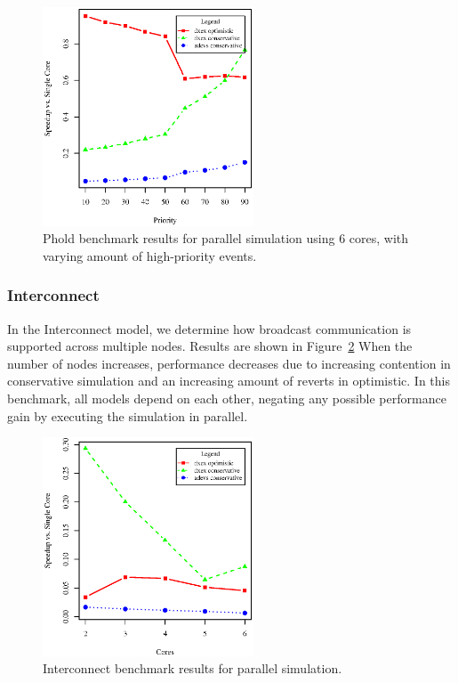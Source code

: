 \begin{figure}
    \includegraphics[width=\columnwidth,height=6.5cm]{fig/phold_priority.eps}
    \caption{Phold benchmark results for parallel simulation using 6 cores, with varying amount of high-priority events.}
    \label{fig:phold_priority}
\end{figure}

\subsubsection{Interconnect}
In the Interconnect model, we determine how broadcast communication is supported across multiple nodes.
Results are shown in Figure~\ref{fig:interconnect_benchmark_parallel}
When the number of nodes increases, performance decreases due to increasing contention in conservative simulation and an increasing amount of reverts in optimistic. In this benchmark, all models depend on each other, negating any possible performance gain by executing the simulation in parallel.

\begin{figure}
    \includegraphics[width=\columnwidth,height=6.5cm]{fig/interconnect_parallel.eps}
    \caption{Interconnect benchmark results for parallel simulation.}
    \label{fig:interconnect_benchmark_parallel}
\end{figure}

